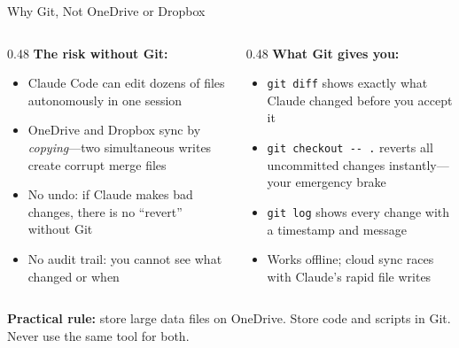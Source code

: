 \documentclass[10pt,english,aspectratio=169]{beamer}
\begin{document}
\begin{frame}{Why Git, Not OneDrive or Dropbox}

\begin{columns}[T]
\begin{column}{0.48\textwidth}
\textbf{The risk without Git:}
\vspace{0.15cm}
\begin{itemize}
    \item Claude Code can edit dozens of files autonomously in one session
    \item OneDrive and Dropbox sync by \textit{copying}---two simultaneous writes create corrupt merge files
    \item No undo: if Claude makes bad changes, there is no ``revert'' without Git
    \item No audit trail: you cannot see what changed or when
\end{itemize}
\end{column}
\begin{column}{0.48\textwidth}
\textbf{What Git gives you:}
\vspace{0.15cm}
\begin{itemize}
    \item \texttt{git diff} shows exactly what Claude changed before you accept it
    \item \texttt{git checkout -{-} .} reverts all uncommitted changes instantly---your emergency brake
    \item \texttt{git log} shows every change with a timestamp and message
    \item Works offline; cloud sync races with Claude's rapid file writes
\end{itemize}
\end{column}
\end{columns}

\vspace{0.25cm}

\textbf{Practical rule:} store large data files on OneDrive. Store code and scripts in Git. Never use the same tool for both.
\end{frame}
\end{document}
